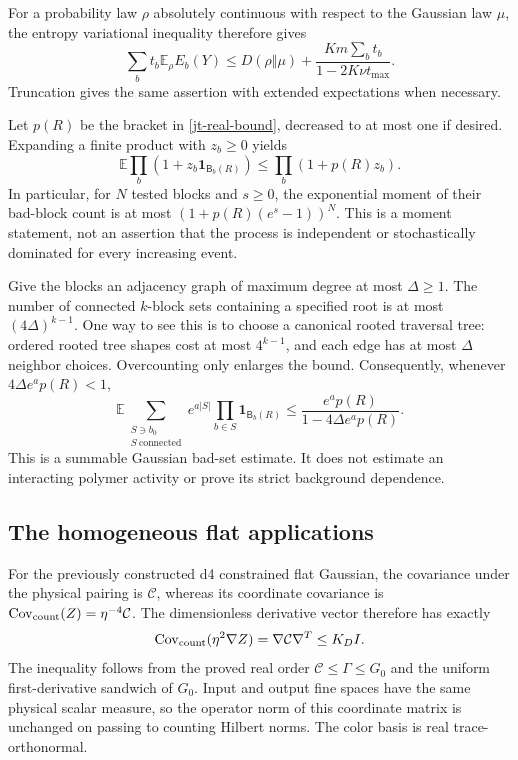 For a probability law $\rho$ absolutely continuous with respect
to the Gaussian law $\mu$, the entropy variational inequality
therefore gives
\begin{equation}\label{jt-relative-entropy}
 \sum_b t_b\mathbb E_\rho E_b(Y)
 \le D(\rho\Vert\mu)
       +\frac{Km\sum_b t_b}{1-2K\nu t_{\max}}.
\end{equation}
Truncation gives the same assertion with extended expectations
when necessary.

Let $p(R)$ be the bracket in \eqref{jt-real-bound}, decreased
to at most one if desired. Expanding a finite product with
$z_b\ge0$ yields
\begin{equation}\label{jt-bad-count-product}
 \mathbb E\prod_b(1+z_b\mathbf1_{\mathsf B_b(R)})
 \le\prod_b(1+p(R)z_b).
\end{equation}
In particular, for $N$ tested blocks and $s\ge0$, the
exponential moment of their bad-block count is at most
$(1+p(R)(e^s-1))^N$. This is a moment statement, not an
assertion that the process is independent or stochastically
dominated for every increasing event.

Give the blocks an adjacency graph of maximum degree at most
$\Delta\ge1$. The number of connected $k$-block sets containing
a specified root is at most $(4\Delta)^{k-1}$. One way to see
this is to choose a canonical rooted traversal tree: ordered
rooted tree shapes cost at most $4^{k-1}$, and each edge has
at most $\Delta$ neighbor choices. Overcounting only enlarges
the bound. Consequently, whenever $4\Delta e^a p(R)<1$,
\begin{equation}\label{jt-connected-sum}
 \boxed{\quad
 \mathbb E\sum_{\substack{S\ni b_0\\S\ \mathrm{connected}}}
 e^{a|S|}\prod_{b\in S}\mathbf1_{\mathsf B_b(R)}
 \le\frac{e^a p(R)}{1-4\Delta e^a p(R)}.
 \quad}
\end{equation}
This is a summable Gaussian bad-set estimate. It does not
estimate an interacting polymer activity or prove its strict
background dependence.

\subsection{The homogeneous flat applications}
\label{jt-flat-applications}

For the previously constructed d4 constrained flat Gaussian,
the covariance under the physical pairing is $\mathcal C$,
whereas its coordinate covariance is
$\operatorname{Cov}_{\rm count}(Z)=\eta^{-4}\mathcal C$.
The dimensionless derivative vector therefore has exactly
\begin{equation}\label{jt-derivative-covariance}
 \operatorname{Cov}_{\rm count}(\eta^2\nabla Z)
 =\nabla\mathcal C\nabla^T\le K_D I.
\end{equation}
The inequality follows from the proved real order
$\mathcal C\le\Gamma\le G_0$ and the uniform first-derivative
sandwich of $G_0$. Input and output fine spaces have the same
physical scalar measure, so the operator norm of this coordinate
matrix is unchanged on passing to counting Hilbert norms.
The color basis is real trace-orthonormal.

